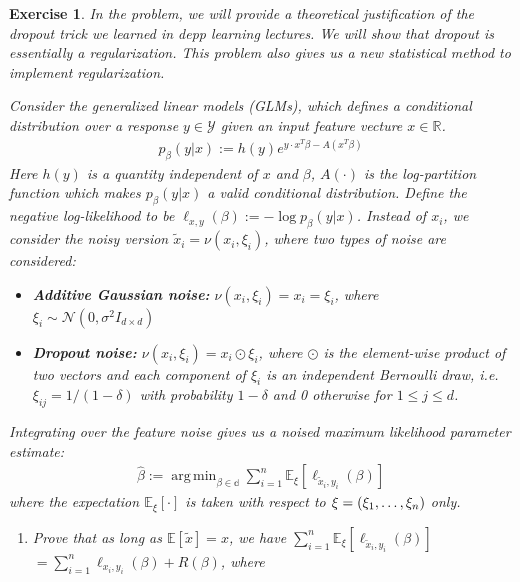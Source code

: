 \documentclass[12pt]{article}
\DeclareMathOperator*{\argmin}{arg\,min}
\theoremstyle{colon}
\newtheorem{exercise}{Exercise}
\begin{document}
\clearpage

\begin{exercise}
  In the problem, we will provide a theoretical justification of the dropout trick we learned in depp learning lectures. We will show that dropout is essentially a regularization. This problem also gives us a new statistical method to implement regularization.

  Consider the generalized linear models (GLMs), which defines a conditional distribution over a response $y \in \mathcal{Y}$ given an input feature vecture $x \in \mathbb{R}$.
  \begin{gather*}
    p_\beta (y | x) := h(y) e^{y \cdot x^T \beta - A(x^T \beta)}
  \end{gather*}
  Here $h(y)$ is a quantity independent of $x$ and $\beta$, $A(\cdot)$ is the log-partition function which makes $p_\beta (y | x)$ a valid conditional distribution. Define the negative log-likelihood to be $\ell_{x,y}(\beta) := -\log p_\beta (y | x)$. Instead of $x_i$, we consider the noisy version $\tilde{x}_i = \nu (x_i, \xi_i)$, where two types of noise are considered:
  \begin{itemize}
    \item \textbf{Additive Gaussian noise:} $\nu(x_i, \xi_i) = x_i = \xi_i$, where \\ $\xi_i \sim \mathcal{N}(0, \sigma^2 I_{d \times d})$
    \item \textbf{Dropout noise:} $\nu(x_i, \xi_i) = x_i \odot \xi_i$, where $\odot$ is the element-wise product of two vectors and each component of $\xi_i$ is an independent Bernoulli draw, i.e. $\xi_{ij} = 1 / (1 - \delta)$ with probability $1 - \delta$ and 0 otherwise for $1 \leq j \leq d$.
  \end{itemize}
  Integrating over the feature noise gives us a noised maximum likelihood parameter estimate:
  \begin{gather*}
    \hat{\beta} := \argmin_{\beta \in \mathbb{d}} \sum_{i=1}^n \mathbb{E}_{\xi} [\ell_{\tilde{x}_i, y_i} (\beta)]
  \end{gather*}
  where the expectation $\mathbb{E}_{\xi}[\cdot]$ is taken with respect to $\xi = (\xi_1, \mathellipsis, \xi_n)$ only.
  \begin{enumerate}[label=\arabic*)]
    \item Prove that as long as $\mathbb{E}[\tilde{x}] = x$, we have $\sum_{i=1}^n \mathbb{E}_\xi [\ell_{\tilde{x}_i, y_i}(\beta)]$ \\   $= \sum_{i=1}^n \ell_{x_i, y_i}(\beta) + R(\beta)$, where

\end{enumerate}
\end{exercise}
\end{document}
